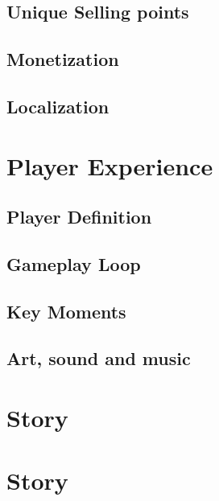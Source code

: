 \documentclass{article}
\begin{document}
\subsection{Unique Selling points}



\subsection{Monetization}



\subsection{Localization}


\section{Player Experience}

\subsection{Player Definition}



\subsection{Gameplay Loop}



\subsection{Key Moments}



\subsection{Art, sound and music}



\section{Story}



\section{Story}
\end{document}
